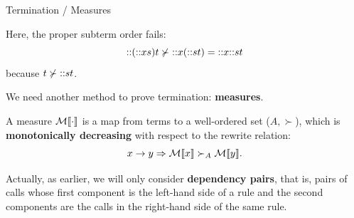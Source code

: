 %
\begin{frame}{Termination / Measures}

  Here, the proper subterm order fails:
  \begin{equation*}
    \textsf{::}{(\textsf{::}{x}{s})}{t} \nsucc
    \textsf{::}{x}{(\textsf{::}{s}{t})} = \textsf{::}{x}{\textsf{::}{s}{t}}
  \end{equation*}
  because \(t \nsucc \textsf{::}{s}{t}\).

  \bigskip

  We need another method to prove termination: \textbf{measures}.

  \bigskip

  A measure \(\mathcal{M}\llbracket{\cdot}\rrbracket\) is a map from terms to a
  well\hyp{}ordered set (\(A, \succ\)), which is \textbf{monotonically
    decreasing} with respect to the rewrite relation:
  \begin{equation*}
    x \rightarrow y \Rightarrow \mathcal{M}\llbracket{x}\rrbracket \succ_A \mathcal{M}\llbracket{y}\rrbracket.
  \end{equation*}

  \medskip

  Actually, as earlier, we will only consider \textbf{dependency
    pairs}, that is, pairs of calls whose first component is the
  left\hyp{}hand side of a rule and the second components are the
  calls in the right\hyp{}hand side of the same rule.

\end{frame}

